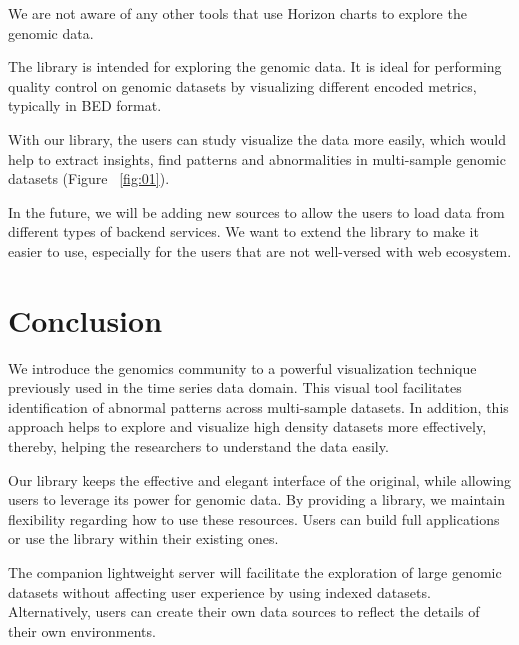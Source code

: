\documentclass[twocolumn]{bmcart}
\begin{document}
We are not aware of any other tools that use Horizon charts to explore the
genomic data.


The library is intended for exploring the genomic data. It is ideal for
performing quality control on genomic datasets by visualizing different encoded
metrics, typically in BED format.

With our library, the users can study visualize the data more easily, which
would help to extract insights, find patterns and abnormalities in multi-sample
genomic datasets (Figure ~\ref{fig:01}).

In the future, we will be adding new sources to allow the users to load data
from different types of backend services. We want to extend the library to make
it easier to use, especially for the users that are not well-versed with web
ecosystem. 



\section*{Conclusion}


We introduce the genomics community to a powerful visualization technique
previously used in the time series data domain. This visual tool facilitates
identification of abnormal patterns across multi-sample datasets.  In addition, this
approach helps to explore and visualize high density datasets more effectively,
thereby, helping the researchers to understand the data easily.

Our library keeps the effective and elegant interface of the original,
while allowing users to leverage its power for genomic data. By providing a
library, we maintain flexibility regarding how to use these resources. Users
can build full applications or use the library within their existing ones.

The companion lightweight server will facilitate the exploration of large
genomic datasets without affecting user experience by using indexed datasets.
Alternatively, users can create their own data sources to reflect the details
of their own environments.
\end{document}
